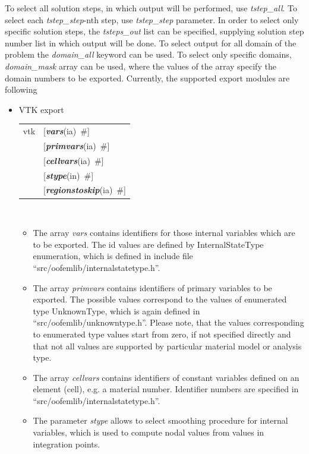 \documentclass[a4paper]{article}
\makeatletter
\newcommand{\param}[1]{{\em #1}}
\newcommand{\keywordnotype}[1]{\mbox{{\it{\bf{#1}}}}}
\newcommand{\keyword}[2]{\mbox{{\keywordnotype{#1}\tiny (#2)}}}
\newcommand{\field}[2]{\mbox{\keyword{#1}{#2}~\#}}
\newcommand{\optField}[2]{\mbox{[\field{#1}{#2}]}}
\newenvironment{record}[1][]{\begin{tabular}{|ll}}{\end{tabular}\\}
\newcommand{\recentry}[2]{{#1}&{#2}\\}
\newcounter{rcc}
\newenvironment{record}[1][\textwidth]{\setcounter{rcc}{0}\begin{tabular*}{#1}{|ll@{\extracolsep{\fill}}r}}{\end{tabular*}\\}
\newcommand{\recentry}[2]{\ifthenelse{\value{rcc}>0}{&$\backslash$ \\}{\setcounter{rcc}{1}}{#1}&{#2}}
\makeatother
\begin{document}
To select all solution steps, in which output will be performed, use
\param{tstep\_all}. To select each \param{tstep\_step}-nth step, use
\param{tstep\_step} parameter. In order to select only specific
solution steps, the \param{tsteps\_out} list can be specified,
supplying solution step number list in which output will be done.
To select output for all domain of the problem the \param{domain\_all}
keyword can be used. To select only specific domains,
\param{domain\_mask} array can be used, where the values of the array
specify the domain numbers to be exported.
Currently, the supported export modules are following
\begin{itemize}
\item VTK export

\begin{record}[0.9\textwidth]
    \recentry{vtk}{\optField{vars}{ia}} \recentry{}{\optField{primvars}{ia}}\recentry{}{\optField{cellvars}{ia}}
    \recentry{}{\optField{stype}{in}} \recentry{}{\optField{regionstoskip}{ia}}
  \end{record}
\begin{itemize}

\item The array \param{vars} contains identifiers for those internal
variables which are to be exported. The id values are defined by
InternalStateType enumeration, which is defined in include file
``src/oofemlib/internal\-statetype.h''.

\item The array \param{primvars}
contains identifiers of primary variables to be exported.
The possible values correspond to the values of enumerated type
UnknownType, which is again defined in ``src/oofemlib/unknown\-type.h''.
Please note, that the values corresponding to enumerated type values
start from zero, if not specified directly and that not all values are
supported by particular material model or analysis type.

\item The array \param{cellvars} contains identifiers of constant variables defined
on an element (cell), e.g. a material number. Identifier numbers are specified in
``src/oofemlib/internalstatetype.h''.

\item The parameter \param{stype} allows to select smoothing procedure for
internal variables, which is used to compute nodal values from values
in integration points.
\end{itemize}


\end{itemize}
\end{document}
